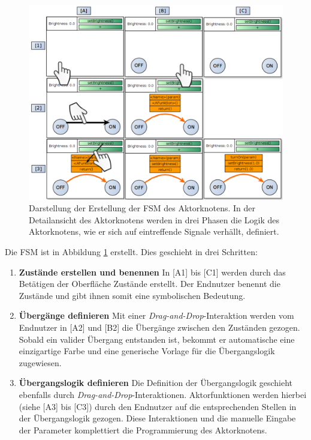 \begin{figure}[h]
  \centering
  \includegraphics[width=1\textwidth]{bilder/chapter4/chapter4_3/createFsm.pdf}
  \caption{Darstellung der Erstellung der \ac{FSM} des Aktorknotens. In der Detailansicht des Aktorknotens werden in drei Phasen die Logik des Aktorknotens, wie er sich auf eintreffende Signale verhällt, definiert.}
  \label{fig:createFSMInteraction}
\end{figure}

Die \ac{FSM} ist in Abbildung \ref{fig:createFSMInteraction} erstellt. Dies geschieht in drei Schritten:
\begin{enumerate}
    \item \textbf{Zustände erstellen und benennen} In [A1] bis [C1] werden durch das Betätigen der Oberfläche Zustände erstellt. Der Endnutzer benennt die Zustände und gibt ihnen somit eine symbolischen Bedeutung.
    \item \textbf{Übergänge definieren} Mit einer \textit{Drag-and-Drop}-Interaktion werden vom Endnutzer in [A2] und [B2] die Übergänge zwischen den Zuständen gezogen. Sobald ein valider Übergang entstanden ist, bekommt er automatische eine einzigartige Farbe und eine generische Vorlage für die Übergangslogik zugewiesen.
    \item \textbf{Übergangslogik definieren} Die Definition der Übergangslogik geschieht ebenfalls durch \textit{Drag-and-Drop}-Interaktionen. Aktorfunktionen werden hierbei (siehe [A3] bis [C3]) durch den Endnutzer auf die entsprechenden Stellen in der Übergangslogik gezogen. Diese Interaktionen und die manuelle Eingabe der Parameter komplettiert die Programmierung des Aktorknotens.
\end{enumerate}

